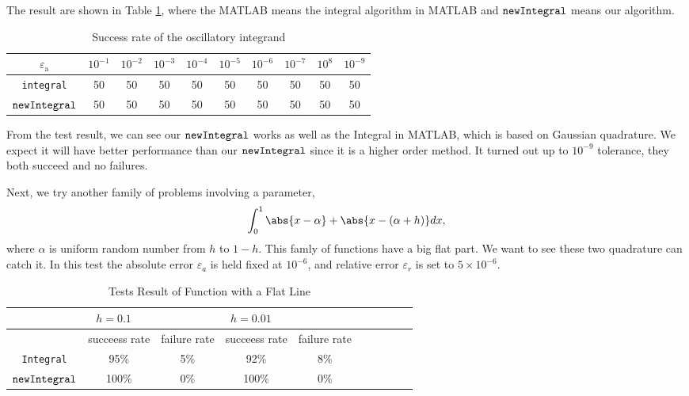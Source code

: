 \documentclass{iitthesis}
\DeclareMathOperator{\newinteg}{\texttt{\textup{newIntegral}}}
\newcommand{\abstol}{\varepsilon_{\textrm{a}}}
\begin{document}
The result are shown in Table \ref{result}, where the MATLAB means the integral algorithm in MATLAB and $\newinteg$ means our algorithm.

\begin{table}[h]\label{result}
 \caption {Success rate of the oscillatory integrand} %
 \centering                          %
 \begin{tabular}{cccccccccc}          %
 \hline\hline                      %
  $\abstol$ & $10^{-1}$ & $10^{-2}$ & $10^{-3}$ & $10^{-4}$ & $10^{-5}$ & $10^{-6}$ & $10^{-7}$ & $10^{8}$ & $10^{-9}$ \\ [0.5ex]
 \hline                                      %
\texttt{integral}  & 50 & 50 & 50 & 50 & 50 & 50 & 50& 50 & 50 \\[1ex] %
 \hline   
 $\newinteg$ & 50 & 50 & 50 & 50 & 50 & 50 & 50& 50 & 50   \\[1ex] %
 \hline                                 %
 \end{tabular}
 \end{table}

From the test result, we can see our $\newinteg$ works as well as the Integral in MATLAB, which is based on Gaussian quadrature. We expect it will have better performance than our $\newinteg$ since it is a higher order method. It turned out up to $ 10^{-9}$ tolerance, they both succeed and no failures. 

Next, we try another family of problems involving a parameter, 
\begin{align*}
\int_{0}^{1} \abs{x-\alpha}+\abs {x-(\alpha+h)} dx,
\end{align*}
where $\alpha$ is uniform random number from $h$ to $1-h$. This famly of functions have a big flat part. We want to see these two quadrature can catch it. In this test the absolute error $\varepsilon_{a}$ is held fixed at $10^{-6}$, and relative error $\varepsilon_{r}$ is set to $5 \times 10^{-6}$. 

\begin{table}[h]
 \caption{Tests Result of Function with a Flat Line} %
 \centering                          %
 \begin{tabular}{cccccccccc}          %
 \hline\hline                        %
 \ &  $h=0.1$ \ & & $h=0.01$ \ & &\\
 \hline
 \ &  succeess rate & failure rate  &  succeess rate & failure rate                                   \\ 
 \hline %
\texttt{Integral}  & 95\% & 5\% & 92\% & 8\% \\[1ex] %
 \hline   
 $\newinteg$  & 100\% & 0\% & 100\% & 0\% \\[1ex] %
 \hline                                 %
 \end{tabular}
 \label{table:h}
 \end{table}
 
\end{document}
